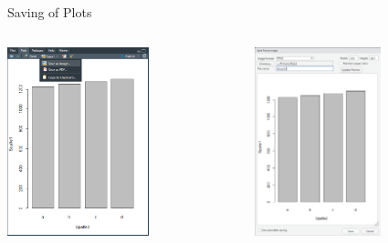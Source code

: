 \documentclass[aspectratio = 169]{chariteBeamer}
\begin{document}
\begin{frame}[fragile]{Saving of Plots}
	\begin{columns}[T]
		\begin{column}{0.5\textwidth}
			\begin{center}
				\includegraphics[height=5.5cm]{SaveImage}
			\end{center}
		\end{column}
		\begin{column}{0.5\textwidth}
			\begin{center}
				\includegraphics[height=5.5cm]{SaveImage2}
			\end{center}
		\end{column}
	\end{columns}	
\end{frame}
\end{document}
